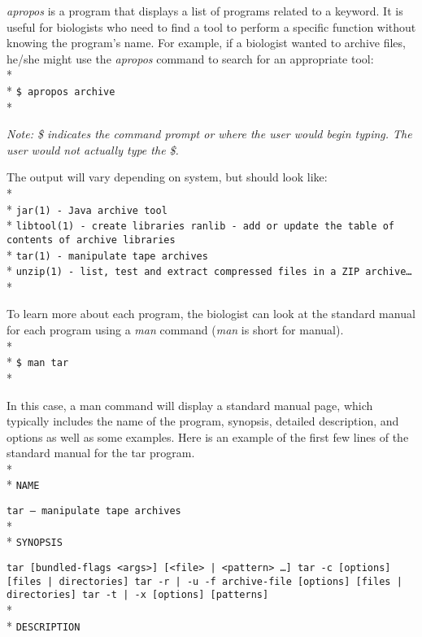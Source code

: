 \documentclass[ChapterTOCs,krantz2]{krantz} %
\begin{document}
\emph{apropos}
is a program that
displays a list of programs related to a keyword. It is
useful for biologists who need to find a tool to perform a specific function without 
knowing the program's name. For example, if a biologist wanted to archive files,
he/she might use the \emph{apropos} command to search for an appropriate tool:\\* \\*
\texttt{\$ apropos archive}\\*

\noindent
\textsl{Note: \$ indicates the command prompt or where the user would begin typing.
The user would not actually type the \$.}

The output will vary depending on system, but should look like:\\* \\*
\texttt{jar(1)    - Java archive tool}\\*
\texttt{libtool(1)    - create libraries ranlib - add or update the table of
contents of archive libraries}\\*
\texttt{tar(1)    - manipulate tape archives}\\*
\texttt{unzip(1)    - list, test and extract compressed files in a
ZIP archive\ldots}\\*

\noindent
To learn more about each program, 
the biologist can look at the standard manual for each program using a
\emph{man} command (\emph{man} is short for manual).\\* \\*
\texttt{\$ man tar}\\*

\noindent
In this case, a man command will display a standard manual page, which
typically includes the name of the program, synopsis, detailed description, and
options as well as some examples. Here is an example of the first few lines of
the standard manual for the tar program.\\* \\*
\texttt{NAME}

\texttt{tar -- manipulate tape archives}\\* \\*
\texttt{SYNOPSIS}

\texttt{tar [bundled-flags <args>] [<file> | <pattern> \ldots] tar {-c}
[options] [files | directories] tar {-r | -u} -f archive-file [options] [files
| directories] tar {-t | -x} [options] [patterns]}\\* \\*
\texttt{DESCRIPTION}
\end{document}
